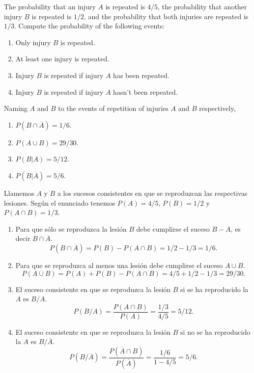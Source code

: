 {The probability that an injury $A$ is repeated is $4/5$, the probability that another injury $B$ is repeated is
$1/2$, and the probability that both injuries are repeated is $1/3$.
Compute the probability of the following events:
\begin{enumerate}
\item Only injury $B$ is repeated.
\item At least one injury is repeated.
\item Injury $B$ is repeated if injury $A$ has been repeated.
\item Injury $B$ is repeated if injury $A$ hasn't been repeated. 
\end{enumerate}
}
{Naming $A$ and $B$ to the events of repetition of injuries $A$ and $B$ respectively,
\begin{enumerate}
\item $P(B\cap\overline{A})=1/6$.
\item $P(A\cup B)=29/30$.
\item $P(B|A)=5/12$.
\item $P(B|\overline{A})=5/6$.
\end{enumerate}
}
{Llamemos $A$ y $B$ a los sucesos consistentes en que se reproduzcan las respectivas lesiones. Según el enunciado tenemos
$P(A)=4/5$, $P(B)=1/2$ y $P(A\cap B)=1/3$.

\begin{enumerate}
\item Para que sólo se reproduzca la lesión $B$ debe cumplirse el suceso $B-A$, es decir $B\cap\overline{A}$.
\[P(B\cap\overline{A})=P(B)-P(A\cap B)=1/2-1/3=1/6.\]

\item Para que se reproduzca al menos una lesión debe cumplirse el suceso $A\cup B$.
\[P(A\cup B)=P(A)+P(B)-P(A\cap B)=4/5+1/2-1/3=29/30.\]

\item El suceso consistente en que se reproduzca la lesión $B$ si se ha reproducido la $A$ es $B/A$.
\[P(B/A)=\frac{P(A\cap B)}{P(A)}=\frac{1/3}{4/5}=5/12.\]

\item El suceso consistente en que se reproduzca la lesión $B$ si no se ha reproducido la $A$ es $B/\overline{A}$.
\[P(B/\overline{A})=\frac{P(\overline{A}\cap B)}{P(\overline{A})}=\frac{1/6}{1-4/5}=5/6.\]
\end{enumerate}
}


